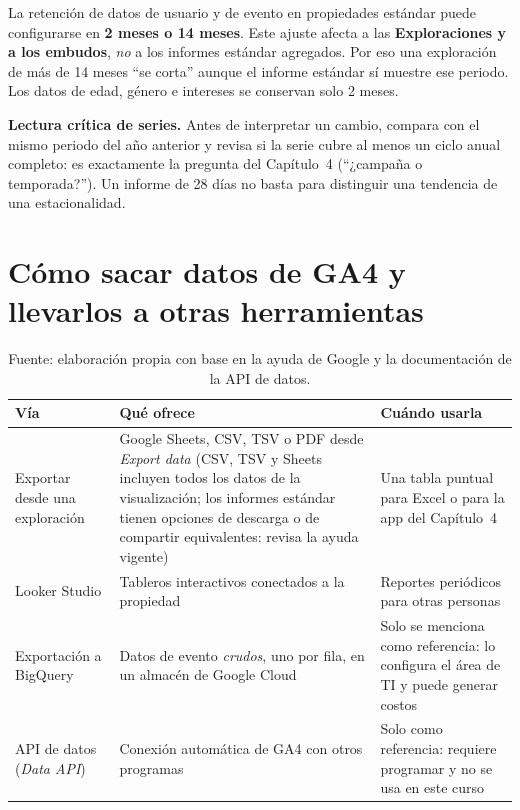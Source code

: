 \documentclass[11pt,letterpaper]{article}
\begin{document}
La retención de datos de usuario y de evento en propiedades estándar puede configurarse en \textbf{2 meses o 14 meses}. Este ajuste afecta a las \textbf{Exploraciones y a los embudos},
\emph{no} a los informes estándar agregados. Por eso una exploración de más de 14 meses \enquote{se corta} aunque el informe estándar sí muestre ese periodo. Los datos de edad, género e
intereses se conservan solo 2 meses.

\begin{cajaAtencion}
\textbf{Lectura crítica de series.} Antes de interpretar un cambio, compara con el mismo periodo del año anterior y revisa si la serie cubre al menos un ciclo anual completo:
es exactamente la pregunta del Capítulo~4 (\enquote{¿campaña o temporada?}). Un informe de 28 días no basta para distinguir una tendencia de una estacionalidad.
\end{cajaAtencion}

\section{Cómo sacar datos de GA4 y llevarlos a otras herramientas}
\label{sec:sacar}

\begin{table}[h]
\centering
\small
\begin{tabularx}{\textwidth}{@{}>{\raggedright\arraybackslash}p{2.8cm}>{\raggedright\arraybackslash}X>{\raggedright\arraybackslash}p{3.8cm}@{}}
\toprule
\textbf{Vía} & \textbf{Qué ofrece} & \textbf{Cuándo usarla} \\
\midrule
Exportar desde una exploración & Google Sheets, CSV, TSV o PDF desde \emph{Export data} (CSV, TSV y Sheets incluyen todos los datos de la visualización; los informes estándar tienen opciones de descarga o de compartir equivalentes: revisa la ayuda vigente) & Una tabla puntual para Excel o para la app del Capítulo~4 \\
Looker Studio & Tableros interactivos conectados a la propiedad & Reportes periódicos para otras personas \\
Exportación a BigQuery & Datos de evento \emph{crudos}, uno por fila, en un almacén de Google Cloud & Solo se menciona como referencia: lo configura el área de TI y puede generar costos \\
API de datos (\emph{Data API}) & Conexión automática de GA4 con otros programas & Solo como referencia: requiere programar y no se usa en este curso \\
\bottomrule
\end{tabularx}
\caption*{Fuente: elaboración propia con base en la ayuda de Google y la documentación de la API de datos.}
\end{table}
\end{document}

